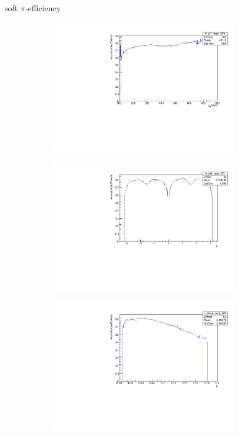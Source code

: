 \documentclass[11pt]{beamer}
\begin{document}
\begin{frame}{soft $\pi$-efficiency}
\begin{figure}
\begin{subfigure}{0.45\textwidth}
\includegraphics[width=0.9\textwidth]{up_pdf/h_pt_reco_SPi.pdf}
\end{subfigure}
\begin{subfigure}{0.45\textwidth}
\includegraphics[width=0.9\textwidth]{up_pdf/h_phi_reco_SPi.pdf}
\end{subfigure}
\begin{subfigure}{0.45\textwidth}
\includegraphics[width=0.9\textwidth]{up_pdf/h_theta_reco_SPi.pdf}

\end{subfigure}
\end{figure}
\end{frame}
\end{document}
